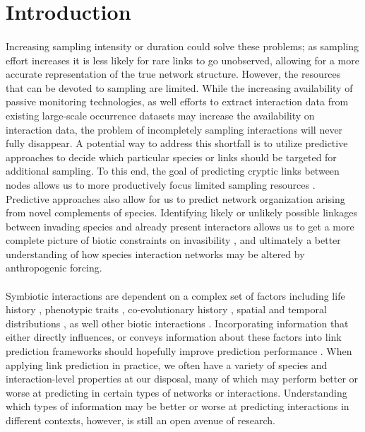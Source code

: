 \documentclass[num-refs]{wiley-article}%
\begin{document}
\clearpage 

\section*{Introduction}
\paragraph*{}

\paragraph*{}
Increasing sampling intensity or duration could solve these problems; as sampling effort increases it is less likely for rare links to go unobserved, allowing for a more accurate representation of the true network structure. However, the resources that can be devoted to sampling are limited. While the increasing availability of passive monitoring technologies\cite{quintero2022methodological}, as well efforts to extract interaction data from existing large-scale occurrence datasets \cite{putman2021power} may increase the availability on interaction data, the problem of incompletely sampling interactions will never fully disappear. A potential way to address this shortfall is to utilize predictive approaches to decide which particular species or links should be targeted for additional sampling. To this end, the goal of predicting cryptic links between nodes allows us to more productively focus limited sampling resources \cite{terry2020finding}. Predictive approaches also allow for us to predict network organization arising from novel complements of species. Identifying likely or unlikely possible linkages between invading species and already present interactors allows us to get a more complete picture of biotic constraints on invasibility \cite{minoarivelo2016invading}, and ultimately a better understanding of how species interaction networks may be altered by anthropogenic forcing.  

\paragraph*{}
Symbiotic interactions are dependent on a complex set of factors including life history \cite{ramos2018fruit}, phenotypic traits \cite{rafferty2013}, co-evolutionary history \cite{eriksson2016evolution}, spatial and temporal distributions \cite{fricke2020accelerating, menke2012plant, laurindo2020drivers}, as well other biotic interactions \cite{carreira2020question}. Incorporating information that either directly influences, or conveys information about these factors into link prediction frameworks should hopefully improve prediction performance \cite{dallas2017predicting}. When applying link prediction in practice, we often have a variety of species and interaction-level properties at our disposal, many of which may perform better or worse at predicting in certain types of networks or interactions. Understanding which types of information may be better or worse at predicting interactions in different contexts, however, is still an open avenue of research. 
\end{document}
